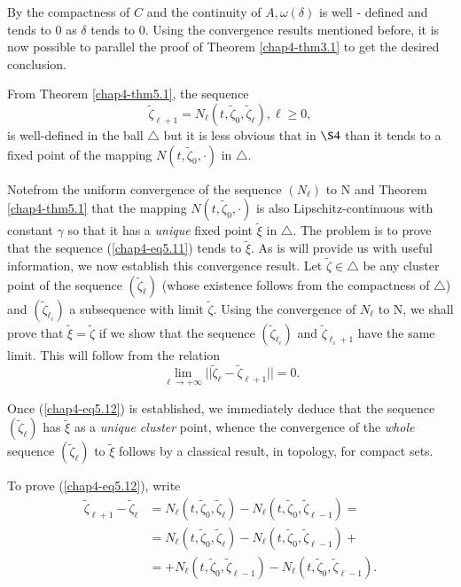 By the compactness of $C$ and the continuity of $A, \omega(\delta)$ is
well - defined and tends to 0 as $\delta$ tends to 0. Using the
convergence results mentioned before, it is now possible to parallel
the proof of Theorem \ref{chap4-thm3.1} to get the desired conclusion.

From Theorem \ref{chap4-thm5.1}, the sequence
\begin{equation*}
\widetilde{\zeta}_{\ell + 1} = N_{\ell}(t, \widetilde{\zeta}_{0},
\widetilde{\zeta}_{\ell}), \ell \geq 0,\tag{5.11}\label{chap4-eq5.11}
\end{equation*}
is well-defined in the ball $\triangle$ but it is less obvious that in
$\S 4$ than it tends to a fixed point of the mapping $N(t,
\widetilde{\zeta}_{0}, \cdot)$ in $\triangle$.

Note\pageoriginale from the uniform convergence of the sequence
$(N_{\ell})$ to N and Theorem \ref{chap4-thm5.1} that the mapping
$N(t, \widetilde{\zeta}_{0}, \cdot)$ is also Lipschitz-continuous with
constant $\gamma$ so that it has a {\em unique} fixed point
$\widetilde{\xi}$ in $\triangle$. The problem is to prove that the
sequence (\ref{chap4-eq5.11}) tends to $\widetilde{\xi}$. As is will
provide us with useful information, we now establish this convergence
result. Let $\widetilde{\zeta} \in \triangle$ be any cluster
point of the sequence $(\widetilde{\zeta}_{\ell})$ (whose existence
follows from the compactness of $\triangle$) and
$(\widetilde{\zeta}_{\ell_{i}})$ a subsequence with limit
$\widetilde{\zeta}$. Using the convergence of $N_{\ell}$ to N, we
shall prove that $\widetilde{\xi} = \widetilde{\zeta}$ if we show that
the sequence $(\widetilde{\zeta}_{\ell_{i}})$ and
$\widetilde{\zeta}_{\ell_{i} + 1}$ have the same limit. This will
follow from the relation
\begin{equation*}
\lim_{\ell \to + \infty} ||\widetilde{\zeta}_{\ell} -
\widetilde{\zeta}_{\ell + 1}|| = 0.\tag{5.12}\label{chap4-eq5.12}
\end{equation*}

Once (\ref{chap4-eq5.12}) is established, we immediately deduce that
the sequence $(\widetilde{\zeta}_{\ell})$ has $\widetilde{\xi}$ as a
{\em unique cluster} point, whence the convergence of the {\em whole}
sequence $(\widetilde{\zeta}_{\ell})$ to $\widetilde{\xi}$ follows by
a classical result, in topology, for compact sets.

To prove (\ref{chap4-eq5.12}), write
\begin{align*}
\widetilde{\zeta}_{\ell + 1} - \widetilde{\zeta}_{\ell} & =
N_{\ell}(t, \widetilde{\zeta}_{0}, \widetilde{\zeta}_{\ell}) -
N_{\ell}(t, \widetilde{\zeta}_{0}, \widetilde{\zeta}_{\ell - 1}) = \\
& = N_{\ell}(t, \widetilde{\zeta}_{0}, \widetilde{\zeta}_{\ell}) -
N_{\ell}(t, \widetilde{\zeta}_{0}, \widetilde{\zeta}_{\ell-1}) +\\
& = + N_{\ell}(t, \widetilde{\zeta}_{0}, \widetilde{\zeta}_{\ell-1}) -
N_{\ell} (t, \widetilde{\zeta}_{0}, \widetilde{\zeta}_{\ell-1}).
\end{align*}

